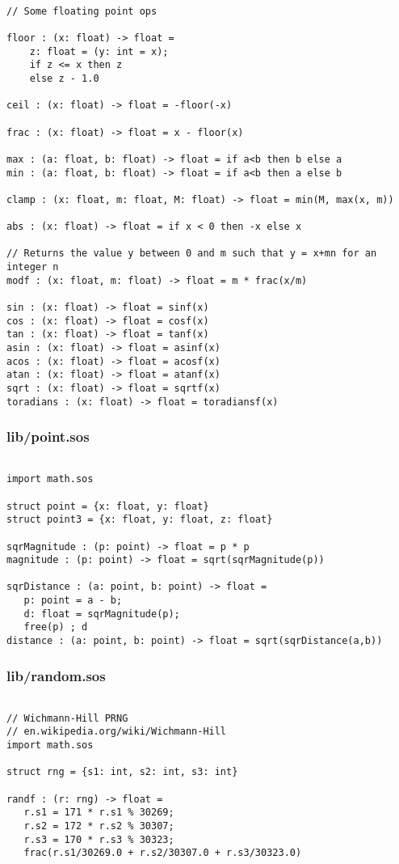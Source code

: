 \documentclass[main.tex]{subfiles}
\begin{document}
\begin{lstlisting}

// Some floating point ops

floor : (x: float) -> float = 
    z: float = (y: int = x);
    if z <= x then z
    else z - 1.0

ceil : (x: float) -> float = -floor(-x)

frac : (x: float) -> float = x - floor(x) 

max : (a: float, b: float) -> float = if a<b then b else a
min : (a: float, b: float) -> float = if a<b then a else b

clamp : (x: float, m: float, M: float) -> float = min(M, max(x, m))

abs : (x: float) -> float = if x < 0 then -x else x

// Returns the value y between 0 and m such that y = x+mn for an integer n
modf : (x: float, m: float) -> float = m * frac(x/m)

sin : (x: float) -> float = sinf(x)
cos : (x: float) -> float = cosf(x)
tan : (x: float) -> float = tanf(x)
asin : (x: float) -> float = asinf(x)
acos : (x: float) -> float = acosf(x)
atan : (x: float) -> float = atanf(x)
sqrt : (x: float) -> float = sqrtf(x)
toradians : (x: float) -> float = toradiansf(x)
\end{lstlisting}

\subsubsection{lib/point.sos}

\begin{lstlisting}

import math.sos

struct point = {x: float, y: float}
struct point3 = {x: float, y: float, z: float}

sqrMagnitude : (p: point) -> float = p * p
magnitude : (p: point) -> float = sqrt(sqrMagnitude(p))

sqrDistance : (a: point, b: point) -> float = 
   p: point = a - b;
   d: float = sqrMagnitude(p);
   free(p) ; d
distance : (a: point, b: point) -> float = sqrt(sqrDistance(a,b))
\end{lstlisting}

\subsubsection{lib/random.sos}

\begin{lstlisting}

// Wichmann-Hill PRNG
// en.wikipedia.org/wiki/Wichmann-Hill
import math.sos

struct rng = {s1: int, s2: int, s3: int}

randf : (r: rng) -> float =
   r.s1 = 171 * r.s1 % 30269;
   r.s2 = 172 * r.s2 % 30307;
   r.s3 = 170 * r.s3 % 30323;
   frac(r.s1/30269.0 + r.s2/30307.0 + r.s3/30323.0)
\end{lstlisting}
\end{document}

